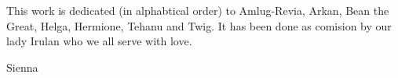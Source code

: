 
\vspace*{\fill}
This work is dedicated (in alphabtical order) to Amlug-Revia, Arkan, Bean the Great, Helga, Hermione, Tehanu and Twig. It has been done as comision by our lady Irulan who we all serve with love.
\vspace{1em}
\begin{flushright}
Sienna
\end{flushright}
\vspace{20em}

\vspace*{\fill}